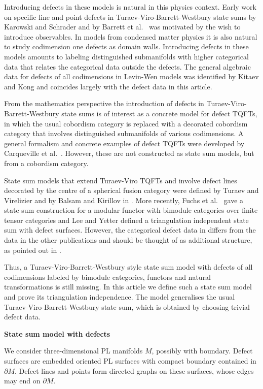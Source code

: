 \documentclass[1.5pt, a4paper]{article}
\begin{document}
Introducing defects in these models is  natural  in this physics context. Early work on specific line and point defects in  Turaev-Viro-Barrett-Westbury state sums by Karowski and Schrader \cite{KS} and by Barrett et al.~\cite{BMG} was motivated by the wish to introduce observables.  
In models from condensed matter physics it is also natural to study codimension one defects as domain walls. 
Introducing defects in these models amounts to labeling distinguished submanifolds  with higher categorical data that relates  the categorical 
data outside the defects. 
 The general algebraic data for defects of all codimensions in Levin-Wen models was identified  by Kitaev and Kong   \cite{KK} and coincides largely with the defect  data in this article.
 
 From the mathematics perspective the introduction of defects in Turaev-Viro-Barrett-Westbury state sums  is of interest  as a concrete model for defect TQFTs, in which the usual cobordism category is replaced with a decorated cobordism category that involves distinguished submanifolds of various codimensions. 
A general formalism and concrete examples of defect TQFTs were developed by Carqueville et al.~\cite{CRS,CRS2,CMS}. However, these  are not constructed as state sum models, but from a cobordism category. 

State sum models that extend  Turaev-Viro TQFTs and involve defect lines decorated by the centre of a spherical fusion category  were defined by Turaev and Virelizier  \cite{TVr,TVbook} and by Balsam and Kirillov in \cite{KB,B}. 
More recently, Fuchs et al.~\cite{FSS}  gave a state sum construction for a modular functor with bimodule categories over finite tensor categories and  Lee and Yetter \cite{LY} defined a triangulation independent state sum with defect surfaces. However,  the categorical defect data in \cite{LY} 
differs from  the data in the other publications and should be thought of as additional structure, as pointed out in \cite{LY}.

Thus, a Turaev-Viro-Barrett-Westbury style state sum model with defects of all codimensions labeled by bimodule categories, functors and natural transformations is still missing. 
In this article we define  such a state sum model  and prove its triangulation independence.  The model  generalises the usual Turaev-Viro-Barrett-Westbury state sum, which is obtained by choosing trivial defect data.

\medskip
{\bf State sum model with defects}

We consider three-dimensional PL manifolds $M$, possibly with boundary.  Defect surfaces  are  embedded oriented PL surfaces with compact boundary  contained in $\partial M$. Defect lines and points form directed graphs on these surfaces, whose edges may end on $\partial M$.  
\end{document}
